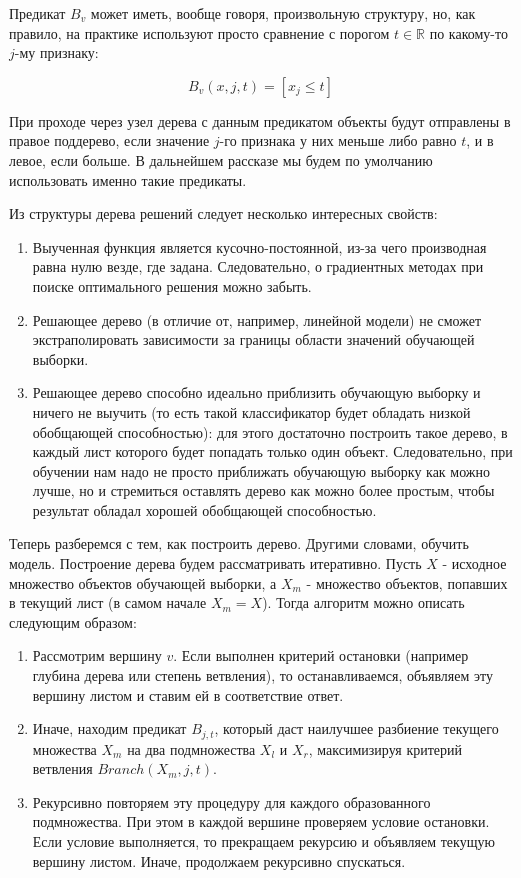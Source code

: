 Предикат $B_v$ может иметь, вообще говоря, произвольную структуру, но, как правило, на практике используют просто сравнение с порогом $t \in \mathbb{R}$ по какому-то $j$-му признаку:

\[ B_v(x,j,t)=[x_j \leq t] \]

При проходе через узел дерева с данным предикатом объекты будут отправлены в правое поддерево, если значение $j$-го признака у них меньше либо равно $t$, и в левое, если больше. В дальнейшем рассказе мы будем по умолчанию использовать именно такие предикаты.

Из структуры дерева решений следует несколько интересных свойств:\cite{SHAD-trees}

\begin{enumerate}
    \item Выученная функция является кусочно-постоянной, из-за чего производная равна нулю везде, где задана. Следовательно, о градиентных методах при поиске оптимального решения можно забыть.
    \item Решающее дерево (в отличие от, например, линейной модели) не сможет экстраполировать зависимости за границы области значений обучающей выборки.
    \item Решающее дерево способно идеально приблизить обучающую выборку и ничего не выучить (то есть такой классификатор будет обладать низкой обобщающей способностью): для этого достаточно построить такое дерево, в каждый лист которого будет попадать только один объект. Следовательно, при обучении нам надо не просто приближать обучающую выборку как можно лучше, но и стремиться оставлять дерево как можно более простым, чтобы результат обладал хорошей обобщающей способностью.
\end{enumerate}

Теперь разберемся с тем, как построить дерево. Другими словами, обучить модель. Построение дерева будем рассматривать итеративно. Пусть $X$ - исходное множество объектов обучающей выборки, а $X_m$ - множество объектов, попавших в текущий лист (в самом начале $X_m = X$). Тогда алгоритм можно описать следующим образом:

\begin{enumerate}
    \item Рассмотрим вершину $v$. Если выполнен критерий остановки (например глубина дерева или степень ветвления), то останавливаемся, объявляем эту вершину листом и ставим ей в соответствие ответ.
    \item Иначе, находим предикат $B_{j,t}$, который даст наилучшее разбиение текущего множества $X_m$ на два подмножества $X_l$ и $X_r$, максимизируя критерий ветвления $Branch(X_m,j,t)$.
    \item Рекурсивно повторяем эту процедуру для каждого образованного подмножества. При этом в каждой вершине проверяем условие остановки. Если условие выполняется, то прекращаем рекурсию и объявляем текущую вершину листом. Иначе, продолжаем рекурсивно спускаться.
\end{enumerate}

